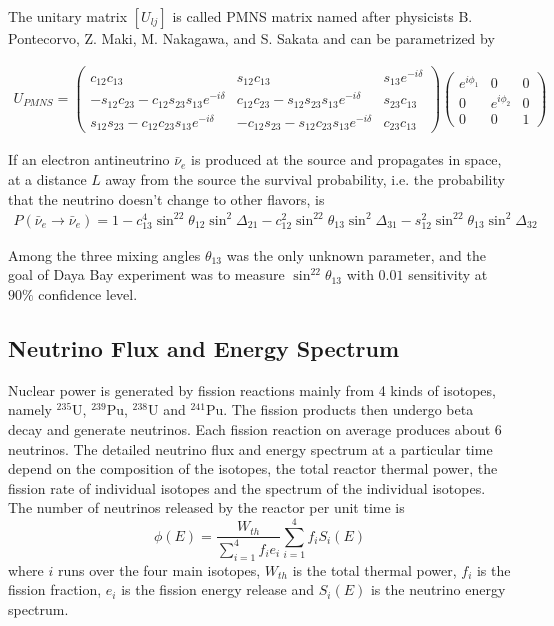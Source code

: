 The unitary matrix $[U_{lj}]$ is called PMNS matrix named after physicists B. Pontecorvo, Z. Maki, M. Nakagawa, and S. Sakata and can be parametrized by

\allowdisplaybreaks
\begin{align}
U_{PMNS}=
\begin{pmatrix}
c_{12}c_{13} & s_{12}c_{13} & s_{13}e^{-i\delta} \\
-s_{12}c_{23}-c_{12}s_{23}s_{13}e^{-i\delta} & c_{12}c_{23}-s_{12}s_{23}s_{13}e^{-i\delta} & s_{23}c_{13} \\
s_{12}s_{23}-c_{12}c_{23}s_{13}e^{-i\delta} & -c_{12}s_{23}-s_{12}c_{23}s_{13}e^{-i\delta} & c_{23}c_{13}
\end{pmatrix}
\begin{pmatrix}
e^{i\phi_1} & 0 & 0 \\
0 & e^{i\phi_2} & 0 \\
0 & 0 & 1
\end{pmatrix}
\end{align}

If an electron antineutrino $\bar{\nu}_e$ is produced at the source and propagates in space, at a distance $L$ away from the source the survival probability, i.e. the probability that the neutrino doesn't change to other flavors, is
\allowdisplaybreaks
\begin{align}
P(\bar{\nu}_e\rightarrow\bar{\nu}_e)=1-c^4_{13}\sin^22\theta_{12}\sin^2\Delta_{21}-c^2_{12}\sin^22\theta_{13}\sin^2\Delta_{31}-s^2_{12}\sin^22\theta_{13}\sin^2\Delta_{32}
\end{align}

Among the three mixing angles $\theta_{13}$ was the only unknown parameter, and the goal of Daya Bay experiment was to measure $\sin^22\theta_{13}$ with $0.01$ sensitivity at $90\%$ confidence level.


\subsection{Neutrino Flux and Energy Spectrum}

Nuclear power is generated by fission reactions mainly from 4 kinds of isotopes, namely $^{235}$U, $^{239}$Pu, $^{238}$U and $^{241}$Pu. The fission products then undergo beta decay and generate neutrinos. Each fission reaction on average produces about 6 neutrinos. The detailed neutrino flux and energy spectrum at a particular time depend on the composition of the isotopes, the total reactor thermal power, the fission rate of individual isotopes and the spectrum of the individual isotopes. The number of neutrinos released by the reactor per unit time is
\begin{equation} \label{eq:neutrino_flux}
  \phi(E)=\frac{W_{th}}{\sum\limits_{i=1}^4f_ie_i}\sum\limits_{i=1}^4f_iS_i(E)
\end{equation}
where $i$ runs over the four main isotopes, $W_{th}$ is the total thermal power, $f_i$ is the fission fraction, $e_i$ is the fission energy release and $S_i(E)$ is the neutrino energy spectrum.

